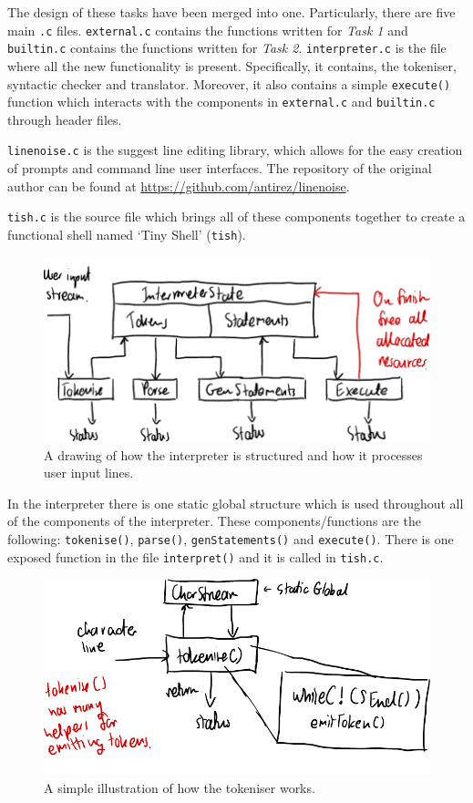 \documentclass[12pt]{article}
\begin{document}
The design of these tasks have been merged into one.
Particularly, there are five main \texttt{.c} files.
\texttt{external.c} contains the functions written for
\textit{Task 1} and \texttt{builtin.c} contains the functions
written for \textit{Task 2}. \texttt{interpreter.c} is the file
where all the new functionality is present. Specifically, it
contains, the tokeniser, syntactic checker and translator.
Moreover, it also contains a simple \texttt{execute()} function
which interacts with the components in \texttt{external.c} and
\texttt{builtin.c} through header files.

\texttt{linenoise.c} is the suggest line editing library, which
allows for the easy creation of prompts and command line user
interfaces. The repository of the original author can be found
at \url{https://github.com/antirez/linenoise}.

\texttt{tish.c} is the source file which brings all of these
components together to create a functional shell named `Tiny
Shell' (\texttt{tish}).

\begin{figure}[H]
\centering
\includegraphics{interpreter-arch}
\caption{A drawing of how the interpreter is structured and how
it processes user input lines.}
\end{figure}

In the interpreter there is one static global structure which is
used throughout all of the components of the interpreter. These
components/functions are the following: \texttt{tokenise()},
\texttt{parse()}, \texttt{genStatements()} and
\texttt{execute()}. There is one exposed function in the file
\texttt{interpret()} and it is called in \texttt{tish.c}.

\begin{figure}[H]
\centering
\includegraphics{tokeniser}
\caption{A simple illustration of how the tokeniser works.}
\end{figure}
\end{document}
